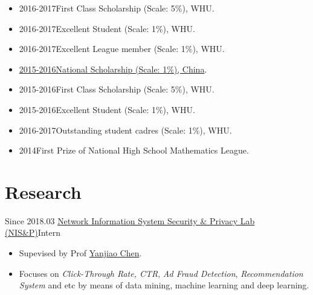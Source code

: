 \documentclass[letterpaper]{twentysecondcv} %
\begin{document}
\begin{itemize}
	\setlength{\itemsep}{0pt}
	\setlength{\parsep}{0pt}
	\setlength{\parskip}{0pt}
	\item 2016-2017\qquad First Class Scholarship (Scale: 5\%), WHU.
	\item 2016-2017\qquad Excellent Student (Scale: 1\%), WHU.
	\item 2016-2017\qquad Excellent League member (Scale: 1\%), WHU.
	\item \href{https://raw.githubusercontent.com/RMSnow/CV/master/materials/NationaScholarship.jpg}
	{2015-2016\qquad National Scholarship (Scale: 1\%), China}.
	\item 2015-2016\qquad First Class Scholarship (Scale: 5\%), WHU.
	\item 2015-2016\qquad Excellent Student (Scale: 1\%), WHU.
	\item 2016-2017\qquad Outstanding student cadres (Scale: 1\%), WHU.
	\item 2014\qquad \qquad \quad First Prize of National High School Mathematics League.
\end{itemize}


\section{Research}


\small{Since 2018.03} \quad \href{http://nisplab.whu.edu.cn/index.html}{Network Information System Security \& Privacy Lab (NIS\&P)}\hfill Intern
\begin{itemize}
	\item Supevised by Prof \href{http://iqua.ece.toronto.edu/ychen/}{Yanjiao Chen}.
	\item Focuses on \emph{Click-Through Rate, CTR}, \emph{Ad Fraud Detection}, 
	\emph{Recommendation System} and etc by means of data mining, machine learning and deep learning.
\end{itemize}
\end{document}

